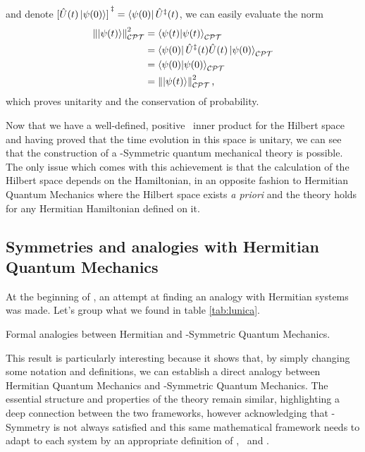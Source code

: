             and denote $\bqty*{\hU\pqty{t}\ket{\psi\pqty{0}}}^\myconj = \bra{\psi\pqty{0}}\hU^\myconj\pqty{t}$, we can easily evaluate the norm
            \begin{align*}
                \norm{\ket{\psi\pqty{t}}}^2_{\CPT}
                &= \braket{\psi{\pqty{t}}}{\psi\pqty{t}}_{\CPT} \\
                &= \bra{\psi\pqty{0}} \hU^\myconj\pqty{t} \hU\pqty{t} \ket{\psi\pqty{0}}_{\CPT} \\
                &= \bra{\psi\pqty{0}}\ket{\psi\pqty{0}}_{\CPT} \\
                &= \norm{\ket{\psi\pqty{t}}}^2_{\CPT}
                \mycomma
            \end{align*}
            which proves unitarity and the conservation of probability.

            Now that we have a well-defined, positive \CPT\ inner product for the Hilbert space and having proved that the time evolution in this space is unitary, we can see that the construction of a \PT-Symmetric quantum mechanical theory is possible. The only issue which comes with this achievement is that the calculation of the Hilbert space depends on the Hamiltonian, in an opposite fashion to Hermitian Quantum Mechanics where the Hilbert space exists \emph{a priori} and the theory holds for any Hermitian Hamiltonian defined on it.

        \subsection{Symmetries and analogies with Hermitian Quantum Mechanics}
            At the beginning of , an attempt at finding an analogy with Hermitian systems was made. Let's group what we found in table \ref{tab:lunica}.
            \begin{table}[h]
                \centering
                \label{tab:lunica}
                
                \caption{Formal analogies between Hermitian and \PT-Symmetric Quantum Mechanics.}
            \end{table}
            
            This result is particularly interesting because it shows that, by simply changing some notation and definitions, we can establish a direct analogy between Hermitian Quantum Mechanics and \PT-Symmetric Quantum Mechanics. The essential structure and properties of the theory remain similar, highlighting a deep connection between the two frameworks, however acknowledging that \PT-Symmetry is not always satisfied and this same mathematical framework needs to adapt to each system by an appropriate definition of \hC, \hP\ and \hT.
           
